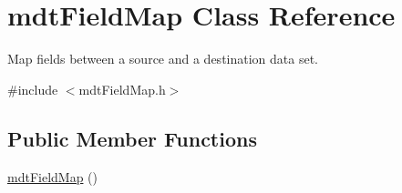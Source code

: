 \hypertarget{classmdt_field_map}{
\section{mdtFieldMap Class Reference}
\label{classmdt_field_map}
}


Map fields between a source and a destination data set.  




{\ttfamily \#include $<$mdtFieldMap.h$>$}

\subsection*{Public Member Functions}
\begin{DoxyCompactItemize}
\item 
\hypertarget{classmdt_field_map_a7e255a2c818c495fe0b8c09ee1317bcd}{
\hyperlink{classmdt_field_map_a7e255a2c818c495fe0b8c09ee1317bcd}{mdtFieldMap} ()}
\label{classmdt_field_map_a7e255a2c818c495fe0b8c09ee1317bcd}


\end{DoxyCompactItemize}

